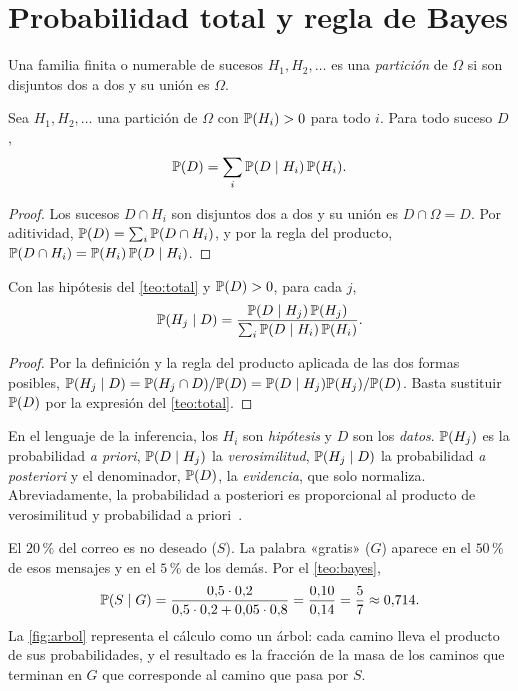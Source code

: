 \section{Probabilidad total y regla de Bayes}

\begin{definicion}[Partición]
Una familia finita o numerable de sucesos $H_1,H_2,\dots$ es una \emph{partición} de $\Omega$ si son disjuntos dos a dos y su unión es $\Omega$.
\end{definicion}

\begin{teorema}\label{teo:total}
Sea $H_1,H_2,\dots$ una partición de $\Omega$ con $\mathbb{P}(H_i)>0$ para todo $i$. Para todo suceso $D$,
\[
\mathbb{P}(D)=\sum_{i}\mathbb{P}(D\mid H_i)\,\mathbb{P}(H_i).
\]
\end{teorema}

\begin{proof}
Los sucesos $D\cap H_i$ son disjuntos dos a dos y su unión es $D\cap\Omega=D$. Por aditividad, $\mathbb{P}(D)=\sum_i\mathbb{P}(D\cap H_i)$, y por la regla del producto, $\mathbb{P}(D\cap H_i)=\mathbb{P}(H_i)\,\mathbb{P}(D\mid H_i)$.
\end{proof}

\begin{teorema}\label{teo:bayes}
Con las hipótesis del \cref{teo:total} y $\mathbb{P}(D)>0$, para cada $j$,
\[
\mathbb{P}(H_j\mid D)=\frac{\mathbb{P}(D\mid H_j)\,\mathbb{P}(H_j)}{\sum_{i}\mathbb{P}(D\mid H_i)\,\mathbb{P}(H_i)}.
\]
\end{teorema}

\begin{proof}
Por la definición y la regla del producto aplicada de las dos formas posibles, $\mathbb{P}(H_j\mid D)=\mathbb{P}(H_j\cap D)/\mathbb{P}(D)=\mathbb{P}(D\mid H_j)\mathbb{P}(H_j)/\mathbb{P}(D)$. Basta sustituir $\mathbb{P}(D)$ por la expresión del \cref{teo:total}.
\end{proof}

En el lenguaje de la inferencia, los $H_i$ son \emph{hipótesis} y $D$ son los \emph{datos}. $\mathbb{P}(H_j)$ es la probabilidad \emph{a priori}, $\mathbb{P}(D\mid H_j)$ la \emph{verosimilitud}, $\mathbb{P}(H_j\mid D)$ la probabilidad \emph{a posteriori} y el denominador, $\mathbb{P}(D)$, la \emph{evidencia}, que solo normaliza. Abreviadamente, la probabilidad a posteriori es proporcional al producto de verosimilitud y probabilidad a priori~\cite[clase~11]{mit1805}.

\begin{ejemplo}\label{ej:spam}
El $20\,\%$ del correo es no deseado ($S$). La palabra «gratis» ($G$) aparece en el $50\,\%$ de esos mensajes y en el $5\,\%$ de los demás. Por el \cref{teo:bayes},
\[
\mathbb{P}(S\mid G)=\frac{0{,}5\cdot 0{,}2}{0{,}5\cdot 0{,}2+0{,}05\cdot 0{,}8}=\frac{0{,}10}{0{,}14}=\frac57\approx 0{,}714.
\]
La \cref{fig:arbol} representa el cálculo como un árbol: cada camino lleva el producto de sus probabilidades, y el resultado es la fracción de la masa de los caminos que terminan en $G$ que corresponde al camino que pasa por $S$.
\end{ejemplo}

